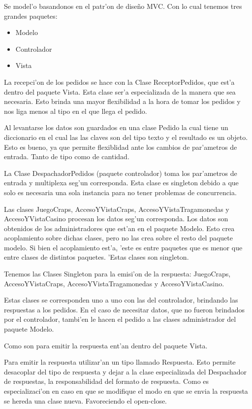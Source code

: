 Se model'o basandonos en el patr'on de diseño MVC. Con lo cual tenemos tres grandes paquetes:

\begin{itemize}
 \item Modelo
 \item Controlador
 \item Vista
\end{itemize}

La recepci'on de los pedidos se hace con la Clase ReceptorPedidos, que est'a dentro del paquete Vista. Esta clase ser'a especializada de la manera que sea necesaria. Esto brinda una mayor flexibilidad a la hora de tomar los pedidos y nos liga menos al tipo en el que llega el pedido.

Al levantarse los datos son guardados en una clase Pedido la cual tiene un diccionario en el cual las las claves son del tipo texto y el resultado es un objeto. Esto es bueno, ya que permite flexiblidad ante los cambios de par'ametros de entrada. Tanto de tipo como de cantidad.

La Clase DespachadorPedidos (paquete controlador) toma los par'ametros de entrada y multiplexa seg'un corresponda. Esta clase es singleton debido a que solo es necesaria una sola instancia para no tener problemas de concurrencia.

Las clases JuegoCraps, AccesoYVistaCraps, AccesoYVistaTragamonedas y AccesoYVistaCasino procesan los datos seg'un corresponda. Los datos son obtenidos de los administradores que est'an en el paquete Modelo. Esto crea acoplamiento sobre dichas clases, pero no las crea sobre el resto del paquete modelo. Si bien el acoplamiento est'a, 'este es entre paquetes que es menor que entre clases de distintos paquetes. 'Estas clases son singleton.

Tenemos las Clases Singleton para la emisi'on de la respuesta: JuegoCraps, AccesoYVistaCraps, AccesoYVistaTragamonedas y AccesoYVistaCasino.

Estas clases se corresponden uno a uno con las del controlador, brindando las respuestas a los pedidos. En el caso de necesitar datos, que no fueron brindados por el controlador, tambi'en le hacen el pedido a las clases administrador del paquete Modelo.

Como son para emitir la respuesta ent'an dentro del paquete Vista.

Para emitir la respuesta utilizar'an un tipo llamado Respuesta. Esto permite desacoplar del tipo de respuesta y dejar a la clase especializada del Despachador de respuestas, la responsabilidad del formato de respuesta. Como es especializaci'on en caso en que se modifique el modo en que se envia la respuesta se hereda una clase nueva. Favoreciendo el open-close.

